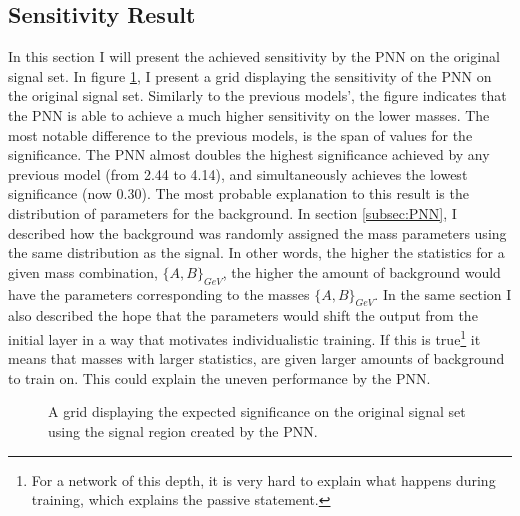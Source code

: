 \subsection{Sensitivity Result}
In this section I will present the achieved sensitivity by the \ac{PNN} on the original signal set. In figure \ref{fig:PNNGridSig}, I present a grid displaying the sensitivity 
of the \ac{PNN} on the original signal set. Similarly to the previous models', the figure indicates that the \ac{PNN} is able to achieve a much higher sensitivity on the lower
masses. The most notable difference to the previous models, is the span of values for the significance. The \ac{PNN} almost doubles the highest significance achieved by any previous model
(from 2.44 to 4.14), and simultaneously achieves the lowest significance (now 0.30). The most probable explanation to this result is the distribution of parameters for the background. 
In section \ref{subsec:PNN}, I described how the background was randomly assigned the mass parameters using the same distribution as the signal. In other words, the higher the statistics 
for a given mass combination, $\{A,B\}_{GeV}$, the higher the amount of background would have the parameters corresponding to the masses $\{A,B\}_{GeV}$. In the 
same section I also described the hope that the parameters would shift the output from the initial layer in a way that motivates individualistic training. If this is 
true\footnote{For a network of this depth, it is very hard to explain what happens during training, which explains the passive statement.} it means that masses with larger statistics, 
are given larger amounts of background to train on. This could explain the uneven performance by the \ac{PNN}. \\
\begin{figure}[H]
    \caption{A grid displaying the expected significance on the original signal set using the signal region 
    created by the \acs{PNN}.}
    \label{fig:PNNGridSig}
\end{figure}
